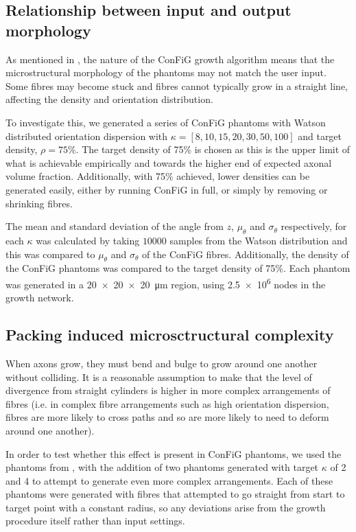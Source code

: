 \subsection{Relationship between input and output morphology}
\label{sec:config_input_output_rel}
As mentioned in , the nature of the \ac{ConFiG} growth algorithm means that the microstructural morphology of the phantoms may not match the user input. Some fibres may become stuck and fibres cannot typically grow in a straight line, affecting the density and orientation distribution.

To investigate this, we generated a series of \ac{ConFiG} phantoms with Watson distributed \cite{Mardia2008} orientation dispersion with $\kappa=[8,10,15,20,30,50,100]$ and target density, $\rho = 75$\%. The target density of 75\% is chosen as this is the upper limit of what is achievable empirically and towards the higher end of expected axonal volume fraction. Additionally, with 75\% achieved, lower densities can be generated easily, either by running \ac{ConFiG} in full, or simply by removing or shrinking fibres.

The mean and standard deviation of the angle from $z$, $\mu_\theta$ and $\sigma_\theta$ respectively, for each $\kappa$ was calculated by taking $10000$ samples from the Watson distribution and this was compared to $\mu_\theta$ and $\sigma_\theta$ of the \ac{ConFiG} fibres. Additionally, the density of the \ac{ConFiG} phantoms was compared to the target density of 75\%. Each phantom was generated in a \SI{20 x 20 x 20}{\micro\metre} region, using \num{2.5e6} nodes in the growth network.

\subsection{Packing induced microsctructural complexity}
\label{sec:micro_packing_induced_complexity}
When axons grow, they must bend and bulge to grow around one another without colliding. It is a reasonable assumption to make that the level of divergence from straight cylinders is higher in more complex arrangements of fibres (i.e. in complex fibre arrangements such as high orientation dispersion, fibres are more likely to cross paths and so are more likely to need to deform around one another).

In order to test whether this effect is present in \ac{ConFiG} phantoms, we used the phantoms from , with the addition of two phantoms generated with target $\kappa$ of 2 and 4 to attempt to generate even more complex arrangements. Each of these phantoms were generated with fibres that attempted to go straight from start to target point with a constant radius, so any deviations arise from the growth procedure itself rather than input settings.

